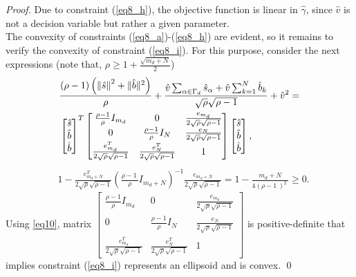 \documentclass[smallextended,referee,envcountsect,,numbers]{svjour3}
\begin{document}
\begin{proof} Due to constraint (\ref{eq8_h}), the objective function is linear in $\hat{\gamma}$, since $\hat{v}$ is not a decision variable but rather a given parameter.\\
The convexity of constraints (\ref{eq8_a})-(\ref{eq8_h}) are evident, so it remains to verify the convexity of constraint (\ref{eq8_i}). For this purpose, consider the next expressions (note that, $\rho \ge 1+\frac{\sqrt{m_d+N}}{2}$)
\begin{align} \label{eq9} 
&\frac{\left(\rho -1\right)\left(\left\|\hat{s}\right\|^2+\|\hat{b}\|^2\right)}{\rho }+\frac{\hat{v}\sum_{\alpha \in {\mathrm{\Gamma }}_d}{{\hat{s}}_{\alpha }}+\hat{v}\sum_{k=1}^N \hat{b}_k}{\sqrt{\rho }\sqrt{\rho -1}}+{\hat{v}}^2=\\
&\left[\begin{matrix} \hat{s}\\\hat{b}\\\hat{b}
\end{matrix} \right]^T
\left[\begin{matrix} \frac{\rho-1}{\rho}I_{m_d}& 0& \frac{e_{m_d}}{2\sqrt{\rho}\sqrt{\rho-1}}\\0& \frac{\rho-1}{\rho}I_{N}&\frac{e_{N}}{2\sqrt{\rho}\sqrt{\rho-1}}\\\frac{e_{m_d}^T}{2\sqrt{\rho}\sqrt{\rho-1}}& \frac{e_{N}^T}{2\sqrt{\rho}\sqrt{\rho-1}}&1
\end{matrix} \right]
\left[\begin{matrix} \hat{s}\\\hat{b}\\\hat{b}
\end{matrix} \right], \notag
\end{align} 
\begin{align} \label{eq10} 
&1-\frac{e_{m_d+N}^T}{2\sqrt{\rho }\sqrt{\rho -1}}{\left(\frac{\rho -1\ }{\rho }I_{m_d+N}\right)}^{-1}\frac{e_{m_d+N}}{2\sqrt{\rho }\sqrt{\rho -1}}=1-\frac{m_d+N}{4{\left(\rho -1\ \right)}^2\ }\ge 0.
\end{align} 
Using \eqref{eq10}, matrix $\left[\begin{matrix} \frac{\rho-1}{\rho}I_{m_d}& 0& \frac{e_{m_d}}{2\sqrt{\rho}\sqrt{\rho-1}}\\0& \frac{\rho-1}{\rho}I_{N}&\frac{e_{N}}{2\sqrt{\rho}\sqrt{\rho-1}}\\\frac{e_{m_d}^T}{2\sqrt{\rho}\sqrt{\rho-1}}& \frac{e_{N}^T}{2\sqrt{\rho}\sqrt{\rho-1}}&1
\end{matrix} \right]
$ is positive-definite that implies constraint (\ref{eq8_i}) represents an ellipsoid and is convex. \qed
\end{proof}
\end{document}
